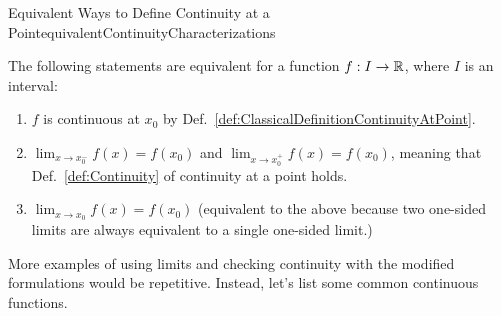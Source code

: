 \bigskip

\begin{factColor}{Equivalent Ways to Define Continuity  at a Point}{equivalentContinuityCharacterizations}

The following statements are equivalent for a function $f:I \to \mathbb R$, where $I$ is an interval:
    \begin{enumerate}
\renewcommand{\labelenumi}{(\alph{enumi})}
\setlength{\itemsep}{.2cm}
    \item $f$ is continuous at $x_0$ by Def.~\ref{def:ClassicalDefinitionContinuityAtPoint}.

    \item $\displaystyle \lim_{x \to x_0^-} f(x) = f(x_0)$ and $\displaystyle \lim_{x \to x_0^+} f(x) = f(x_0)$, meaning that Def.~\ref{def:Continuity} of continuity at a point holds. 

    \item  $\displaystyle \lim_{x \to x_0} f(x) = f(x_0)$ (equivalent to the above because two one-sided limits are always equivalent to a single one-sided limit.)
    \end{enumerate}    
\end{factColor}

More examples of using limits and checking continuity with the modified formulations would be repetitive. Instead, let's list some common continuous functions.


